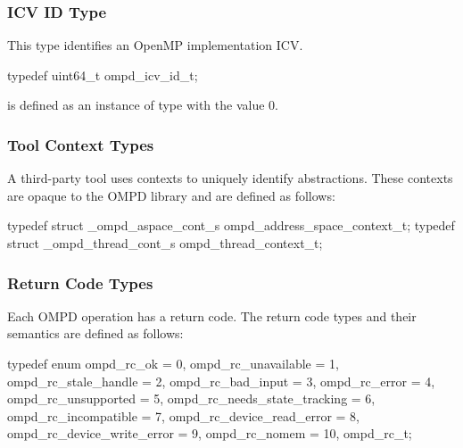 \subsubsection{ICV ID Type}
\label{subsubsec:ompd_icv_id_t}

\summary

This type identifies an OpenMP implementation ICV.

\format

\begin{ccppspecific}
\begin{ompSyntax}
typedef uint64_t ompd_icv_id_t;
\end{ompSyntax}
\end{ccppspecific}

 is defined as an instance of type  with 
the value 0.



\subsubsection{Tool Context Types}
\label{subsubsec:ompd_address_space_context_t}
\label{subsubsec:ompd_thread_context_t}

A third-party tool uses contexts to uniquely identify abstractions. These contexts are opaque to
the OMPD library and are defined as follows:

\format

\begin{ccppspecific}
\begin{ompSyntax}
typedef struct _ompd_aspace_cont_s ompd_address_space_context_t;
typedef struct _ompd_thread_cont_s ompd_thread_context_t;
\end{ompSyntax}
\end{ccppspecific}


\subsubsection{Return Code Types}
\label{subsubsec:ompd_rc_t}

Each OMPD operation has a return code. The return code types and their semantics are defined as
follows:

\format

\begin{ccppspecific}
\begin{ompSyntax}
typedef enum {
  ompd_rc_ok = 0,
  ompd_rc_unavailable = 1,
  ompd_rc_stale_handle = 2,
  ompd_rc_bad_input = 3,
  ompd_rc_error = 4,
  ompd_rc_unsupported = 5,
  ompd_rc_needs_state_tracking = 6,
  ompd_rc_incompatible = 7,
  ompd_rc_device_read_error = 8,
  ompd_rc_device_write_error = 9,
  ompd_rc_nomem = 10,
} ompd_rc_t;
\end{ompSyntax}
\end{ccppspecific}


